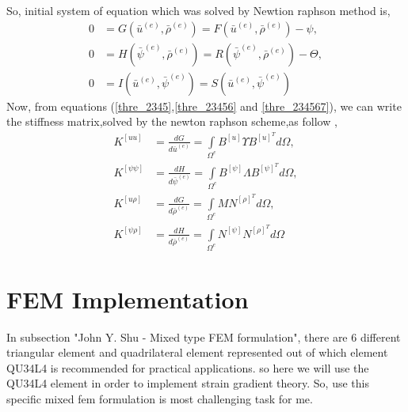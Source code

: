 \documentclass[12pt]{article}
\begin{document}
So, initial system of equation which was solved by Newtion raphson method is,
\begin{equation}\label{thre_234567}
\begin{aligned}
0 &= G(\bar{u}^{(e)},\bar{\rho}^{(e)}) = F(\bar{u}^{(e)},\bar{\rho}^{(e)}) - \psi, \\
0 &= H(\bar{\psi}^{(e)},\bar{\rho}^{(e)}) = R(\bar{\psi}^{(e)},\bar{\rho}^{(e)}) - \Theta, \\
0 &= I(\bar{u}^{(e)},\bar{\psi}^{(e)}) = S(\bar{u}^{(e)},\bar{\psi}^{(e)}) 
\end{aligned}
\end{equation}
Now, from equations (\ref{thre_2345},\ref{thre_23456} and \ref{thre_234567}), we can write the stiffness matrix,solved by the newton raphson scheme,as follow \cite{zybell2012three},
\begin{equation}\label{thre_2345678}
\begin{aligned}
K^{[uu]}  &= \frac{dG}{d\bar{u}^{(e)}} = \int\limits_{\Omega^{e}}\! B^{[u]}\Upsilon B^{[u]^{T}} d\Omega, \\
K^{[\psi\psi]}  &= \frac{dH}{d\bar{\psi}^{(e)}} =\int\limits_{\Omega^{e}}\! B^{[\psi]} \varLambda B^{[\psi]^{T}} d\Omega, \\
K^{[u\rho]}  &= \frac{dG}{d\bar{\rho}^{(e)}}  =\int\limits_{\Omega^{e}}\! M N^{[\rho]^{T}} d\Omega, \\
K^{[\psi\rho]}  &= \frac{dH}{d\bar{\rho}^{(e)}} =\int\limits_{\Omega^{e}}\! N^{[\psi]} N^{[\rho]^{T}} d\Omega
\end{aligned}
\end{equation}
\newpage
\section{FEM Implementation}
In subsection "John Y. Shu - Mixed type FEM formulation", there are 6 different triangular element and quadrilateral element represented out of which element QU34L4 is recommended for practical applications. so here we will use the QU34L4 element in order to implement strain gradient theory. So, use this specific mixed fem formulation \cite{Lzybell2007} is most challenging task for me.
\\
\end{document}
